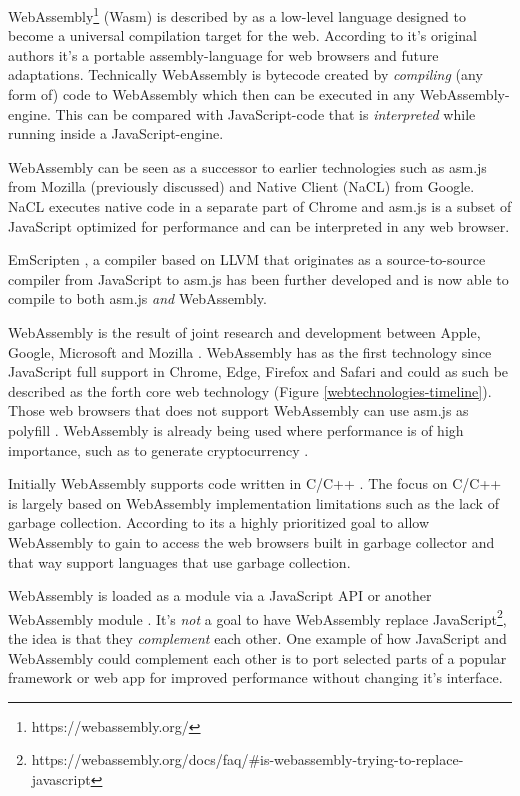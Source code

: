 WebAssembly\footnote{https://webassembly.org/} (Wasm) is described by \textcite{Watt2018,JangdaPowersGuhaBerger2019} as a low-level language designed to become a universal compilation target for the web. According to it's original authors \textcite{HaasRossbergSchuffTitzerHolmanGohmanWagnerZakaiBastien2017} it's a portable assembly-language for web browsers and future adaptations. Technically WebAssembly is bytecode created by \emph{compiling} (any form of) code to WebAssembly \parencite{Watt2018} which then can be executed in any WebAssembly-engine. This can be compared with JavaScript-code that is \emph{interpreted} while running inside a JavaScript-engine.

WebAssembly can be seen as a successor to earlier technologies such as asm.js from Mozilla (previously discussed) and Native Client (NaCL) from Google. NaCL executes native code in a separate part of Chrome and asm.js  \parencite{Zakai2018} is a subset of JavaScript optimized for performance \parencite{VanEsNicolayStievenartDHondtDeRoover2016} and can be interpreted in any web browser.

EmScripten \parencite{Zakai2011}, a compiler based on LLVM \parencite{LattnerAdve2014} that originates as a source-to-source compiler from JavaScript to asm.js \parencite{Zakai2011} has been further developed \parencite{HaasRossbergSchuffTitzerHolmanGohmanWagnerZakaiBastien2017} and is now able to compile to both asm.js \emph{and} WebAssembly.

WebAssembly is the result of joint research and development between Apple, Google, Microsoft and Mozilla \parencite{HaasRossbergSchuffTitzerHolmanGohmanWagnerZakaiBastien2017}. WebAssembly has as the first technology since JavaScript full support in Chrome, Edge, Firefox and Safari and could as such be described as the forth core web technology (Figure \ref{webtechnologies-timeline}). Those web browsers that does not support WebAssembly can use asm.js as polyfill \parencite{HaasRossbergSchuffTitzerHolmanGohmanWagnerZakaiBastien2017}. WebAssembly is already being used where performance is of high importance, such as to generate cryptocurrency \parencite{RuthZimmermannWolsingHohlfeld2018}.

Initially WebAssembly supports code written in C/C++ \parencite{HaasRossbergSchuffTitzerHolmanGohmanWagnerZakaiBastien2017}. 
The focus on C/C++ is largely based on WebAssembly implementation limitations such as the lack of garbage collection. According to \textcite{HaasRossbergSchuffTitzerHolmanGohmanWagnerZakaiBastien2017} its a highly prioritized goal to allow WebAssembly to gain to access the web browsers built in garbage collector and that way support languages that use garbage collection.

WebAssembly is loaded as a module via a JavaScript API or another WebAssembly module \parencite{HaasRossbergSchuffTitzerHolmanGohmanWagnerZakaiBastien2017}. It's \emph{not} a goal to have WebAssembly replace JavaScript\footnote{https://webassembly.org/docs/faq/\#is-webassembly-trying-to-replace-javascript}, the idea is that they \emph{complement} each other. One example of how JavaScript and WebAssembly could complement each other is to port selected parts of a popular framework or web app for improved performance without changing it's interface.
